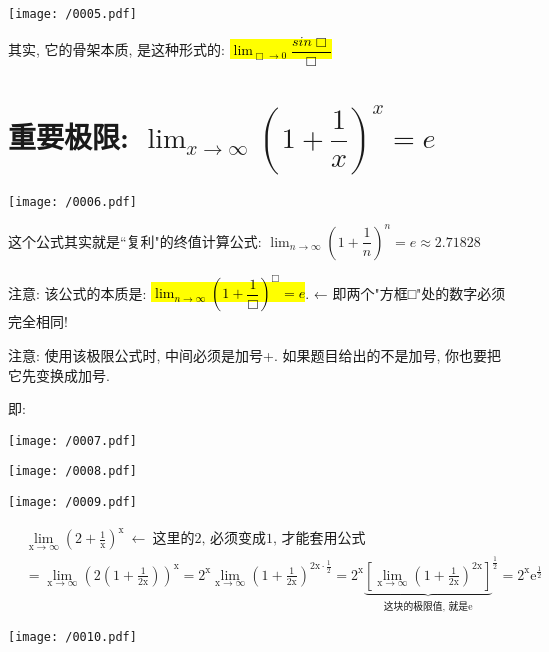 \documentclass[UTF8]{ctexart}
\begin{document}
\texttt{[image: /0005.pdf]}

其实, 它的骨架本质, 是这种形式的: \hl{$\lim_{\Box \to 0} \dfrac{sin \Box} {\Box}$}




\section{重要极限: $ \boxed{\lim_{x \to \infty} (1+ \dfrac{1} {x})^x = e} $}

\texttt{[image: /0006.pdf]}

这个公式其实就是``复利"的终值计算公式: $ \lim_{n \to \infty} (1+ \dfrac{1} {n})^n = e \approx 2.71828 $

注意: 该公式的本质是: \hl{$\lim_{n \to \infty} (1+ \dfrac{1} {\Box})^\Box = e$}.  ← 即两个"方框□"处的数字必须完全相同!

注意: 使用该极限公式时, 中间必须是加号+. 如果题目给出的不是加号, 你也要把它先变换成加号.
	
即: 

\texttt{[image: /0007.pdf]}




\begin{myEnvSample}
\texttt{[image: /0008.pdf]}

\texttt{[image: /0009.pdf]}
\end{myEnvSample}



\begin{myEnvSample}
	\begin{align*}  %
		&\lim_{\text{x}\rightarrow \infty}\left( 2+\frac{1}{\text{x}} \right) ^{\text{x}}\ \gets \ \text{这里的2,\ 必须变成1,\ 才能套用公式}\\
	&=\lim_{\text{x}\rightarrow \infty}\left( 2\left( 1+\frac{1}{2\text{x}} \right) \right) ^{\text{x}}=2^{\text{x}}\lim_{\text{x}\rightarrow \infty}\left( 1+\frac{1}{2\text{x}} \right) ^{2\text{x}\cdot \frac{1}{2}}=2^{\text{x}}\underset{\text{这块的极限值,\ 就是e}}{\underbrace{\left[ \lim_{\text{x}\rightarrow \infty}\left( 1+\frac{1}{2\text{x}} \right) ^{2\text{x}} \right] }}^{\frac{1}{2}}=2^{\text{x}}\text{e}^{\frac{1}{2}}
	\end{align*}

\texttt{[image: /0010.pdf]}
\end{myEnvSample}
\end{document}
